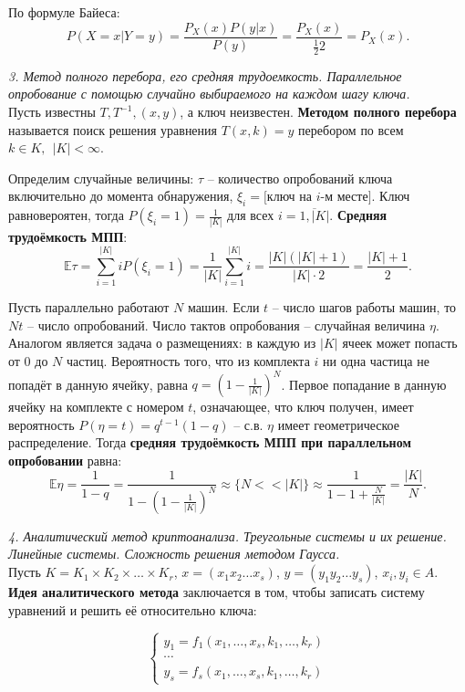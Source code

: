 По формуле Байеса:
$$P(X = x | Y = y) = \frac{P_X(x) P(y | x)}{P(y)} = \frac{P_X(x)}{\frac{1}{2} 2} = P_X(x).$$

\noindent \textit{3. Метод полного перебора, его средняя трудоемкость. Параллельное опробование с помощью случайно выбираемого на каждом шагу ключа.} \\

Пусть известны $T, T^{-1}, (x, y)$, а ключ неизвестен. \textbf{Методом полного перебора} называется поиск решения уравнения $T(x, k) = y$ перебором по всем $k \in K,\ \ |K| < \infty$.

Определим случайные величины: $\tau$ -- количество опробований ключа включительно до момента обнаружения, $\xi_i = [$ключ на $i$-м месте$]$. Ключ равновероятен, тогда $P(\xi_i = 1) = \frac{1}{|K|}$ для всех $i = \overline{1, |K|}$. \textbf{Средняя трудоёмкость МПП}:
$$\mathbb{E} \tau = \sum_{i = 1}^{|K|} i P (\xi_i = 1)= \frac{1}{|K|} \sum_{i = 1}^{|K|} i = \frac{|K|(|K| + 1)}{|K| \cdot 2} = \frac{|K| + 1}{2}.$$

Пусть параллельно работают $N$ машин. Если $t$ -- число шагов работы машин, то $Nt$ -- число опробований. Число тактов опробования -- случайная величина $\eta$. Аналогом является задача о размещениях: в каждую из $|K|$ ячеек может попасть от $0$ до $N$ частиц. Вероятность того, что из комплекта $i$ ни одна частица не попадёт в данную ячейку, равна $q = (1 - \frac{1}{|K|})^N$. Первое попадание в данную ячейку на комплекте с номером $t$, означающее, что ключ получен, имеет вероятность $P(\eta = t) = q^{t-1}(1-q)$ -- с.в. $\eta$ имеет геометрическое распределение. Тогда \textbf{средняя трудоёмкость МПП при параллельном опробовании} равна: 
$$\mathbb{E}\eta = \frac{1}{1 - q} = \frac{1}{1 - (1 - \frac{1}{|K|})^N} \approx \big \{ N << |K| \big \} \approx \frac{1}{1 - 1 + \frac{N}{|K|}} = \frac{|K|}{N}.$$

\noindent \textit{4. Аналитический метод криптоанализа. Треугольные системы и их решение. Линейные системы. Сложность решения методом Гаусса.} \\

Пусть $K = K_1 \times K_2 \times \ldots \times K_r$, $x = (x_1 x_2 \ldots x_s)$, $y = (y_1 y_2 \ldots y_s)$, $x_i, y_i \in A$. \textbf{Идея аналитического метода} заключается в том, чтобы записать систему уравнений и решить её относительно ключа:

\begin{equation*}
    \begin{cases}
    y_1 = f_1 (x_1, \ldots, x_s, k_1, \ldots, k_r) \\
    \cdots \\
    y_s = f_s (x_1, \ldots, x_s, k_1, \ldots, k_r) 
    \end{cases}
\end{equation*}

